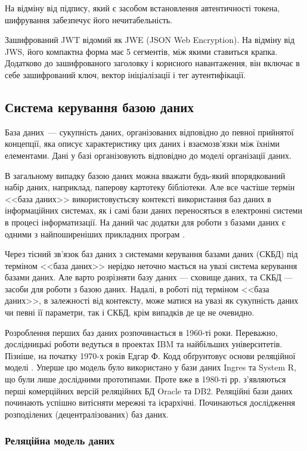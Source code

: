 На відміну від підпису, який є засобом встановлення автентичності токена, шифрування забезпечує його нечитабельність.

Зашифрований JWT відомий як JWE (JSON Web Encryption). На відміну від JWS, його компактна форма має 5 сегментів, між якими ставиться крапка. Додатково до зашифрованого заголовку і корисного навантаження, він включає в себе зашифрований ключ, вектор ініціалізації і тег аутентифікації.

\subsection{Система керування базою даних}
База даних~--- сукупність даних, організованих відповідно до певної прийнятої концепції, яка описує характеристику цих даних і взаємозв'язки між їхніми елементами. Дані у базі організовують відповідно до моделі організації даних. 

В загальному випадку базою даних можна вважати будь-який впорядкований набір даних, наприклад, паперову картотеку бібліотеки. Але все частіше термін <<база даних>> використовуєтьсяу контексті використання баз даних в інформаційних системах, як і самі бази даних переносяться в електронні системи в процесі інформатизації. На даний час додатки для роботи з базами даних є одними з найпоширеніших прикладних програм \cite{ситник2004проектування}.

Через тісний зв'язок баз даних з системами керування базами даних (СКБД) під терміном <<база даних>> нерідко неточно мається на увазі система керування базами даних. Але варто розрізняти базу даних — сховище даних, та СКБД — засоби для роботи з базою даних. Надалі, в роботі під терміном <<база даних>>, в залежності від контексту, може матися на увазі як сукупність даних чи певні її параметри, так і СКБД, крім випадків де це не очевидно.

Розроблення перших баз даних розпочинається в 1960-ті роки. Переважно, дослідницькі роботи ведуться в проектах IBM та найбільших університетів. Пізніше, на початку 1970-х років Едгар Ф. Кодд обґрунтовує основи реляційної моделі \cite{codd1970relational}. Уперше цю модель було використано у бази даних Ingres та System R, що були лише дослідними прототипами. Проте вже в 1980-ті рр. з’являються перші комерційних версій реляційних БД Oracle та DB2. Реляційні бази даних починають успішно витісняти мережні та ієрархічні. Починаються дослідження розподілених (децентралізованих) баз даних.

\subsubsection{Реляційна модель даних}\label{subsection:relationModel}

